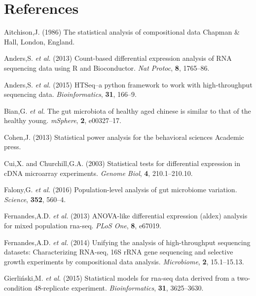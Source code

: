 \documentclass[onecolumn]{article}
\begin{document}
\clearpage

\hypertarget{references}{%
\section*{References}\label{references}}

\hypertarget{refs}{}
\leavevmode\hypertarget{ref-Aitchison:1986}{}%
Aitchison,J. (1986) The statistical analysis of compositional data
Chapman \& Hall, London, England.

\leavevmode\hypertarget{ref-Anders:2013aa}{}%
Anders,S. \emph{et al.} (2013) Count-based differential expression
analysis of RNA sequencing data using R and Bioconductor. \emph{Nat
Protoc}, \textbf{8}, 1765--86.

\leavevmode\hypertarget{ref-Anders:2015aa}{}%
Anders,S. \emph{et al.} (2015) HTSeq--a python framework to work with
high-throughput sequencing data. \emph{Bioinformatics}, \textbf{31},
166--9.

\leavevmode\hypertarget{ref-bian:2017}{}%
Bian,G. \emph{et al.} The gut microbiota of healthy aged chinese is
similar to that of the healthy young. \emph{mSphere}, \textbf{2},
e00327--17.

\leavevmode\hypertarget{ref-cohen_effect}{}%
Cohen,J. (2013) Statistical power analysis for the behavioral sciences
Academic press.

\leavevmode\hypertarget{ref-Cui:2003aa}{}%
Cui,X. and Churchill,G.A. (2003) Statistical tests for differential
expression in cDNA microarray experiments. \emph{Genome Biol},
\textbf{4}, 210.1--210.10.

\leavevmode\hypertarget{ref-Falony:2016aa}{}%
Falony,G. \emph{et al.} (2016) Population-level analysis of gut
microbiome variation. \emph{Science}, \textbf{352}, 560--4.

\leavevmode\hypertarget{ref-fernandes:2013}{}%
Fernandes,A.D. \emph{et al.} (2013) ANOVA-like differential expression
(aldex) analysis for mixed population rna-seq. \emph{PLoS One},
\textbf{8}, e67019.

\leavevmode\hypertarget{ref-fernandes:2014}{}%
Fernandes,A.D. \emph{et al.} (2014) Unifying the analysis of
high-throughput sequencing datasets: Characterizing RNA-seq, 16S rRNA
gene sequencing and selective growth experiments by compositional data
analysis. \emph{Microbiome}, \textbf{2}, 15.1--15.13.

\leavevmode\hypertarget{ref-Gierlinski:2015aa}{}%
Gierliński,M. \emph{et al.} (2015) Statistical models for rna-seq data
derived from a two-condition 48-replicate experiment.
\emph{Bioinformatics}, \textbf{31}, 3625--3630.
\end{document}
